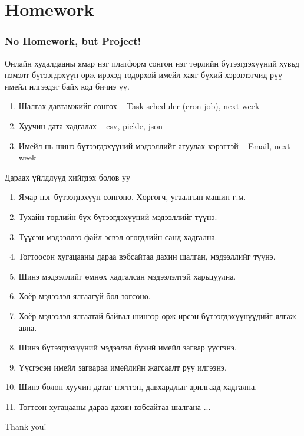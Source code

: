 \documentclass{beamer}
\begin{document}
\section{Homework} 

\begin{frame}
    \frametitle{No Homework, but Project!}
    
\begin{flushleft}
    Онлайн худалдааны ямар нэг платформ сонгон нэг төрлийн бүтээгдэхүүний хувьд
    нэмэлт бүтээгдэхүүн орж ирэхэд тодорхой имейл хаяг бүхий хэрэглэгчид рүү 
    имейл илгээдэг байх код бичнэ үү. 

    \begin{enumerate}
        \item Шалгах давтамжийг сонгох – Task scheduler (cron job), next week
        \item Хуучин дата хадгалах – csv, pickle, json
        \item Имейл нь шинэ бүтээгдэхүүний мэдээллийг агуулах хэрэгтэй – Email, next week
    \end{enumerate}

    \tiny
Дараах үйлдлүүд хийгдэх болов уу
    \begin{enumerate}
        \item Ямар нэг бүтээгдэхүүн сонгоно. Хөргөгч, угаалгын машин г.м. 
        \item Тухайн төрлийн бүх бүтээгдэхүүний мэдээллийг түүнэ. 
        \item Түүсэн мэдээллээ файл эсвэл өгөгдлийн санд хадгална.
        \item Тогтоосон хугацааны дараа вэбсайтаа дахин шалган, мэдээллийг түүнэ. 
        \item Шинэ мэдээллийг өмнөх хадгалсан мэдээлэлтэй харьцуулна. 
        \item Хоёр мэдээлэл ялгаагүй бол зогсоно. 
        \item Хоёр мэдээлэл ялгаатай байвал шинээр орж ирсэн бүтээгдэхүүнүүдийг ялгаж авна. 
        \item Шинэ бүтээгдэхүүний мэдээлэл бүхий имейл загвар үүсгэнэ. 
        \item Үүсгэсэн имейл загвараа имейлийн жагсаалт руу илгээнэ. 
        \item Шинэ болон хуучин датаг нэгтгэн, давхардлыг арилгаад хадгална. 
        \item Тогтсон хугацааны дараа дахин вэбсайтаа шалгана ...
    \end{enumerate}

\end{flushleft}
\end{frame}

\begin{frame}
\Huge{\centerline{Thank you!}}
\end{frame}

\end{document}

